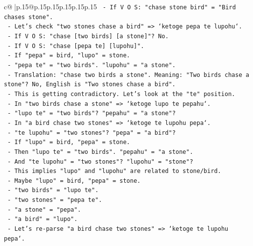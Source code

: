 \documentclass{article}
\begin{document}
{\begin{supertabular}{c@{$\;$}|p{.15\linewidth}@{}p{.15\linewidth}p{.15\linewidth}p{.15\linewidth}p{.15\linewidth}p{.15\linewidth}}
{{{\texttt{             {-} If V O S: "chase stone bird" = "Bird chases stone".} \\
\texttt{             {-} Let's check "two stones chase a bird" => `ketoge pepa te lupohu`.} \\
\texttt{               {-} If V O S: "chase {[}two birds{]} {[}a stone{]}"? No.} \\
\texttt{               {-} If V O S: "chase {[}pepa te{]} {[}lupohu{]}".} \\
\texttt{               {-} If "pepa" = bird, "lupo" = stone.} \\
\texttt{               {-} "pepa te" = "two birds". "lupohu" = "a stone".} \\
\texttt{               {-} Translation: "chase two birds a stone". Meaning: "Two birds chase a stone"? No, English is "Two stones chase a bird".} \\
\texttt{               {-} This is getting contradictory. Let's look at the "te" position.} \\
\texttt{               {-} In "two birds chase a stone" => `ketoge lupo te pepahu`.} \\
\texttt{                 {-} "lupo te" = "two birds"? "pepahu" = "a stone"?} \\
\texttt{               {-} In "a bird chase two stones" => `ketoge te lupohu pepa`.} \\
\texttt{                 {-} "te lupohu" = "two stones"? "pepa" = "a bird"?} \\
\texttt{                 {-} If "lupo" = bird, "pepa" = stone.} \\
\texttt{                 {-} Then "lupo te" = "two birds". "pepahu" = "a stone".} \\
\texttt{                 {-} And "te lupohu" = "two stones"? "lupohu" = "stone"?} \\
\texttt{                 {-} This implies "lupo" and "lupohu" are related to stone/bird.} \\
\texttt{                 {-} Maybe "lupo" = bird, "pepa" = stone.} \\
\texttt{                 {-} "two birds" = "lupo te".} \\
\texttt{                 {-} "two stones" = "pepa te".} \\
\texttt{                 {-} "a stone" = "pepa".} \\
\texttt{                 {-} "a bird" = "lupo".} \\
\texttt{                 {-} Let's re{-}parse "a bird chase two stones" => `ketoge te lupohu pepa`.} \\
}}}
\end{supertabular}}
\end{document}
